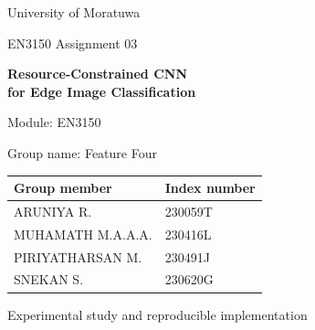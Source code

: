 \documentclass[11pt,a4paper]{article}
\begin{document}
\hypersetup{pageanchor=false}
\begin{titlepage}
\centering
{\large University of Moratuwa\par}
\vspace{2cm}
{\Large EN3150 Assignment 03\par}
\vspace{0.8cm}
{\huge\bfseries Resource-Constrained CNN\\[0.3cm]for Edge Image Classification\par}
\vspace{1.8cm}
{\large Module: EN3150\par}
{\large Group name: Feature Four\par}
\vspace{1cm}
\begin{tabular}{ll}\toprule
Group member & Index number\\\midrule
{ARUNIYA R.} & {230059T}\\
{MUHAMATH M.A.A.A.} & {230416L}\\
{PIRIYATHARSAN M.} & {230491J}\\
{SNEKAN S.} & {230620G}\\\bottomrule
\end{tabular}
\vfill
{\large Experimental study and reproducible implementation\par}
\end{titlepage}
\hypersetup{pageanchor=true}
\begin{abstract}
Four CNNs are evaluated on a deterministic stratified 70/15/15 split of 27,000
EuroSAT RGB images, using $64\times64$ inputs. Model A uses standard convolutions;
Model B replaces later convolutions with depthwise-separable blocks. A controlled
optimizer comparison selects Adam, and both custom models are trained for 25
epochs. Model B has \BParams{} trainable parameters and achieves
\BAccuracy\% test accuracy, compared with \AAccuracy\% for Model A.
ImageNet-pretrained MobileNetV2 and EfficientNet-B0 achieve \MobileAccuracy\%
and \EfficientAccuracy\%, respectively, after two-stage fine-tuning.
Model B reduces parameters by \ParamReduction\% relative to Model A, but does
not improve its measured host latency. The results show a storage--accuracy
trade-off and demonstrate why arithmetic counts alone cannot predict runtime.
\end{abstract}
\tableofcontents
\clearpage









\clearpage


\clearpage


\end{document}
